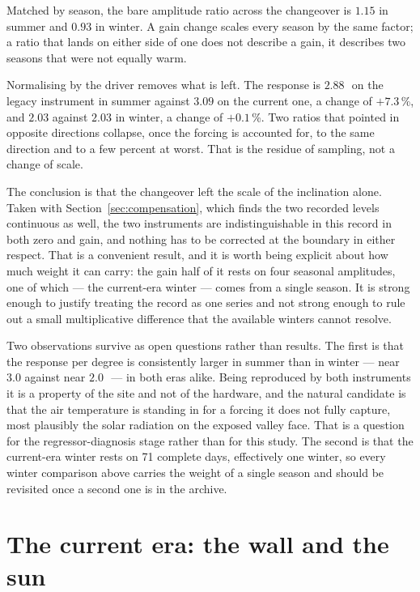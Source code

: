 \documentclass[11pt,a4paper]{article}
\begin{document}
Matched by season, the bare amplitude ratio across the changeover is $1.15$ in summer and $0.93$ in winter. A gain change scales every season by the same factor; a ratio that lands on either side of one does not describe a gain, it describes two seasons that were not equally warm.

Normalising by the driver removes what is left. The response is $2.88$\,\mdegC\ on the legacy instrument in summer against $3.09$ on the current one, a change of $+7.3$\,\%, and $2.03$ against $2.03$ in winter, a change of $+0.1$\,\%. Two ratios that pointed in opposite directions collapse, once the forcing is accounted for, to the same direction and to a few percent at worst. That is the residue of sampling, not a change of scale.

The conclusion is that the changeover left the scale of the inclination alone. Taken with Section~\ref{sec:compensation}, which finds the two recorded levels continuous as well, the two instruments are indistinguishable in this record in both zero and gain, and nothing has to be corrected at the boundary in either respect. That is a convenient result, and it is worth being explicit about how much weight it can carry: the gain half of it rests on four seasonal amplitudes, one of which --- the current-era winter --- comes from a single season. It is strong enough to justify treating the record as one series and not strong enough to rule out a small multiplicative difference that the available winters cannot resolve.

Two observations survive as open questions rather than results. The first is that the response per degree is consistently larger in summer than in winter --- near $3.0$ against near $2.0$\,\mdegC\ --- in both eras alike. Being reproduced by both instruments it is a property of the site and not of the hardware, and the natural candidate is that the air temperature is standing in for a forcing it does not fully capture, most plausibly the solar radiation on the exposed valley face. That is a question for the regressor-diagnosis stage rather than for this study. The second is that the current-era winter rests on 71 complete days, effectively one winter, so every winter comparison above carries the weight of a single season and should be revisited once a second one is in the archive.

\section{The current era: the wall and the sun}
\label{sec:current_era}
\end{document}
